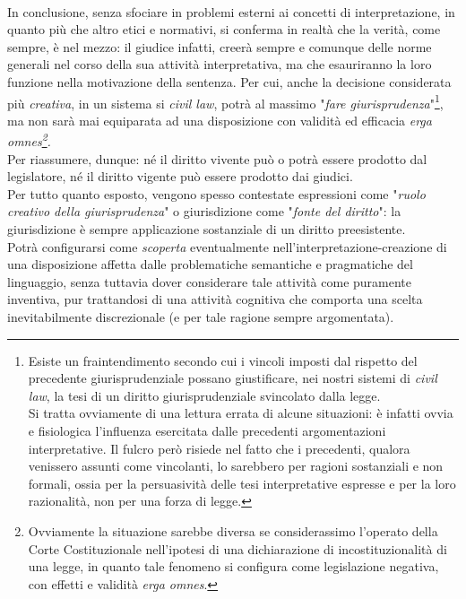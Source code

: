 \\In conclusione, senza sfociare in problemi esterni ai concetti di interpretazione, in quanto più che altro etici e normativi, si conferma in realtà che la verità, come sempre, è nel mezzo: il giudice infatti, creerà sempre e comunque delle norme generali nel corso della sua attività interpretativa, ma che esauriranno la loro funzione nella motivazione della sentenza.
Per cui, anche la decisione considerata più \textit{creativa}, in un sistema si \textit{civil law}, potrà al massimo "\textit{fare giurisprudenza}"\footnote{Esiste un fraintendimento secondo cui i vincoli imposti dal rispetto del precedente giurisprudenziale possano giustificare, nei nostri sistemi di \textit{civil law}, la tesi di un diritto giurisprudenziale svincolato dalla legge.
\\Si tratta ovviamente di una lettura errata di alcune situazioni: è infatti ovvia e fisiologica l'influenza esercitata dalle precedenti argomentazioni interpretative.
Il fulcro però risiede nel fatto che i precedenti, qualora venissero assunti come vincolanti, lo sarebbero per ragioni sostanziali e non formali, ossia per la persuasività delle tesi interpretative espresse e per la loro razionalità, non per una forza di legge.}, ma non sarà mai equiparata ad una disposizione con validità ed efficacia \textit{erga omnes\footnote{Ovviamente la situazione sarebbe diversa se considerassimo l'operato della Corte Costituzionale nell'ipotesi di una dichiarazione di incostituzionalità di una legge, in quanto tale fenomeno si configura come legislazione negativa, con effetti e validità \textit{erga omnes}.}.}
\\Per riassumere, dunque: né il diritto vivente può o potrà essere prodotto dal legislatore, né il diritto vigente può essere prodotto dai giudici.
\\Per tutto quanto esposto, vengono spesso contestate espressioni come "\textit{ruolo creativo della giurisprudenza}" o giurisdizione come "\textit{fonte del diritto}": la giurisdizione è sempre applicazione sostanziale di un diritto preesistente.
\\Potrà configurarsi come \textit{scoperta} eventualmente nell'interpretazione-creazione di una disposizione affetta dalle problematiche semantiche e pragmatiche del linguaggio, senza tuttavia dover considerare tale attività come puramente inventiva, pur trattandosi di una attività cognitiva che comporta una scelta inevitabilmente discrezionale (e per tale ragione sempre argomentata).

